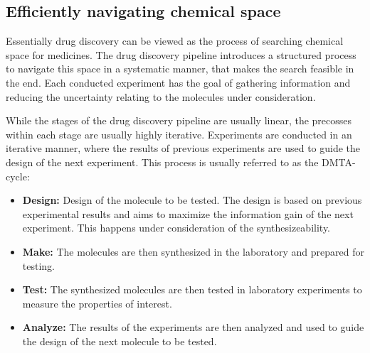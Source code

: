 \subsection{Efficiently navigating chemical space}
Essentially drug discovery can be viewed as the process of searching 
chemical space for medicines. The drug discovery pipeline introduces 
a structured process to navigate this space in a systematic manner, 
that makes the search feasible in the end. Each conducted experiment
has the goal of gathering information and reducing the uncertainty
relating to the molecules under consideration.

While the stages of the drug discovery pipeline are usually linear, the
precosses within each stage are usually highly iterative. Experiments are
conducted in an iterative manner, where the results of previous experiments are
used to guide the design of the next experiment. This process is usually
referred to as the \ac{DMTA}-cycle:
\begin{itemize}
    \item \textbf{Design:} Design of the molecule to be
    tested. The design is based on previous experimental results and
    aims to maximize the information gain of the next experiment.
    This happens under consideration of the synthesizeability.
    \item \textbf{Make:} The molecules are then synthesized in the laboratory
    and prepared for testing.
    \item \textbf{Test:} The synthesized molecules are then tested in
    laboratory experiments to measure the properties of interest.
    \item \textbf{Analyze:} The results of the experiments are then analyzed
    and used to guide the design of the next molecule to be tested.
\end{itemize}



